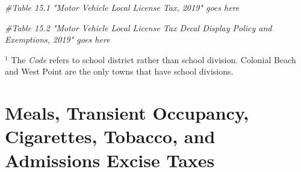 \documentclass[
]{book}
\newenvironment{Shaded}{\begin{snugshade}}{\end{snugshade}}
\newcommand{\CommentTok}[1]{\textcolor[rgb]{0.56,0.35,0.01}{\textit{#1}}}
\begin{document}
\begin{Shaded}
\begin{Highlighting}[]
\CommentTok{\#Table 15.1 "Motor Vehicle Local License Tax, 2019" goes here}

\CommentTok{\#Table 15.2 "Motor Vehicle Local License Tax Decal Display Policy and Exemptions, 2019" goes here}
\end{Highlighting}
\end{Shaded}

\(^1\) The \emph{Code} refers to school district rather than school division. Colonial Beach and West Point are the only towns that have school divisions.

\hypertarget{meals-transient-occupancy-cigarettes-tobacco-and-admissions-excise-taxes}{%
\chapter{Meals, Transient Occupancy, Cigarettes, Tobacco, and Admissions Excise Taxes}\label{meals-transient-occupancy-cigarettes-tobacco-and-admissions-excise-taxes}}
\end{document}

